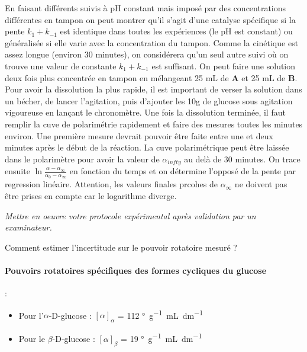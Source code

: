 \documentclass[twoside,a4paper,11pt,answers]{exam}
\begin{document}
\begin{questions}
\begin{solution}
    En faisant différents suivis à pH constant mais imposé par des concentrations différentes en tampon on peut montrer qu'il s'agit d'une catalyse spécifique si la pente $k_1 + k_{-1}$ est identique dans toutes les expériences (le pH est constant) ou généralisée si elle varie avec la concentration du tampon. Comme la cinétique est assez longue (environ 30 minutes), on considérera qu'un seul autre suivi où on trouve une valeur de constante $k_1 + k_{-1}$ est suffisant. On peut faire une solution deux fois plus concentrée en tampon en mélangeant 25 mL de \textbf{A} et 25 mL de \textbf{B}. Pour avoir la dissolution la plus rapide, il est important de verser la solution dans un bécher, de lancer l'agitation, puis d'ajouter les 10g de glucose sous agitation vigoureuse en lançant le chronomètre. Une fois la dissolution terminée, il faut remplir la cuve de polarimétrie rapidement et faire des mesures toutes les minutes environ. Une première mesure devrait pouvoir être faite entre une et deux minutes après le début de la réaction. La cuve polarimétrique peut être laissée dans le polarimètre pour avoir la valeur de $\alpha_{infty}$ au delà de 30 minutes. On trace ensuite $\ln{\frac{\alpha - \alpha_{\infty}}{\alpha_0 - \alpha_{\infty}}}$ en fonction du temps et on détermine l'opposé de la pente par regression linéaire. Attention, les valeurs finales prcohes de $\alpha_{\infty}$ ne doivent pas être prises en compte car le logarithme diverge.
\end{solution}

\par \textit{Mettre en oeuvre votre protocole expérimental après validation par un examinateur.}

\begin{framed}
\question Comment estimer l'incertitude sur le pouvoir rotatoire mesuré ?
\begin{solution}[3cm]

\end{solution}
\end{framed}


\end{questions}

\paragraph*{Pouvoirs rotatoires spécifiques des formes cycliques du glucose} :
\begin{itemize}
        \item Pour l'$\alpha$-D-glucose : $[\alpha]_{\alpha}$ = 112 \unit{\degree.g^{-1}.mL.dm^{-1}} 
        \item Pour le $\beta$-D-glucose : $[\alpha]_{\beta}$ = 19 \unit{\degree.g^{-1}.mL.dm^{-1}} 
\end{itemize}
\end{document}
